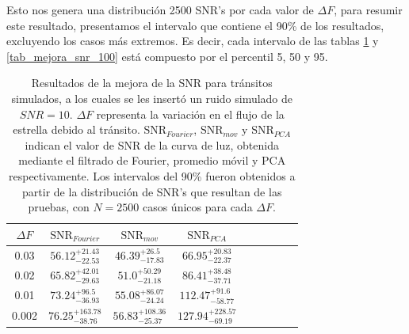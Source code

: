 Esto nos genera una distribución 2500 SNR's por cada valor de $\Delta F$, para resumir este resultado, presentamos el intervalo que contiene el 90\% de los resultados, excluyendo los casos más extremos. Es decir, cada intervalo de las tablas \ref{tab_mejora_snr_10} y \ref{tab_mejora_snr_100} está compuesto por el percentil 5, 50 y 95.  

\begin{table}[H]
	\centering
	\begin{tabular}{ccccccccc}
	\hline 
	$\Delta F$ & $\mbox{SNR}_{Fourier}$ &  $\mbox{SNR}_{mov}$ & $\mbox{SNR}_{PCA}$\\ 
	\hline
	0.03 & 	${56.12}_{-22.53}^{+21.43}$ & ${46.39}_{-17.83}^{+26.5}$ & ${66.95}_{-22.37}^{+20.83}$ \\
	0.02 &  ${65.82}_{-29.63}^{+42.01}$ & ${51.0}_{-21.18}^{+50.29}$ & ${86.41}_{-37.71}^{+38.48}$ \\
	0.01 & ${73.24}_{-36.93}^{+96.5}$ & ${55.08}_{-24.24}^{+86.07}$ & ${112.47}_{-58.77}^{+91.6}$ \\
	0.002 & ${76.25}_{-38.76}^{+163.78}$ & ${56.83}_{-25.37}^{+108.36}$	& ${127.94}_{-69.19}^{+228.57}$ \\
	\hline 
	\end{tabular} 
	\caption{Resultados de la mejora de la SNR para tránsitos simulados, a los cuales se les insertó un ruido simulado de $SNR=10$. $\Delta F$ representa la variación en el flujo de la estrella debido al tránsito. $\mbox{SNR}_{Fourier}$, $\mbox{SNR}_{mov}$ y $\mbox{SNR}_{PCA}$ indican el valor de SNR de la curva de luz, obtenida mediante el filtrado de Fourier, promedio móvil y PCA respectivamente. Los intervalos del 90\% fueron obtenidos a partir de la distribución de SNR's que resultan de las pruebas, con $N=2500$ casos únicos para cada $\Delta F$.}
	\label{tab_mejora_snr_10}
	\end{table}



